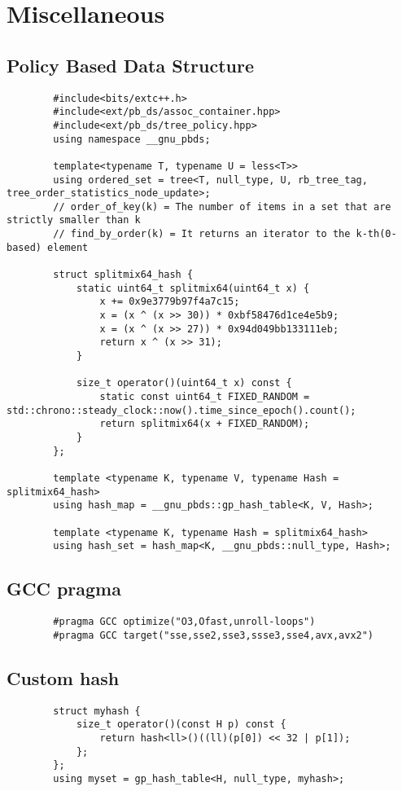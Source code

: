 \documentclass[landscape, 8pt, a4paper, oneside, twocolumn]{extarticle}
\begin{document}
	\section{Miscellaneous}
	\subsection {Policy Based Data Structure}
	\begin{verbatim}
		#include<bits/extc++.h>
		#include<ext/pb_ds/assoc_container.hpp>
		#include<ext/pb_ds/tree_policy.hpp>
		using namespace __gnu_pbds;
		
		template<typename T, typename U = less<T>>
		using ordered_set = tree<T, null_type, U, rb_tree_tag, tree_order_statistics_node_update>;
		// order_of_key(k) = The number of items in a set that are strictly smaller than k
		// find_by_order(k) = It returns an iterator to the k-th(0-based) element
		
		struct splitmix64_hash {
			static uint64_t splitmix64(uint64_t x) {
				x += 0x9e3779b97f4a7c15;
				x = (x ^ (x >> 30)) * 0xbf58476d1ce4e5b9;
				x = (x ^ (x >> 27)) * 0x94d049bb133111eb;
				return x ^ (x >> 31);
			}
			
			size_t operator()(uint64_t x) const {
				static const uint64_t FIXED_RANDOM = std::chrono::steady_clock::now().time_since_epoch().count();
				return splitmix64(x + FIXED_RANDOM);
			}
		};
		
		template <typename K, typename V, typename Hash = splitmix64_hash>
		using hash_map = __gnu_pbds::gp_hash_table<K, V, Hash>;
		
		template <typename K, typename Hash = splitmix64_hash>
		using hash_set = hash_map<K, __gnu_pbds::null_type, Hash>;
	\end{verbatim}
	\subsection {GCC pragma}
	\begin{verbatim}
		#pragma GCC optimize("O3,Ofast,unroll-loops")
		#pragma GCC target("sse,sse2,sse3,ssse3,sse4,avx,avx2")
	\end{verbatim}
	\subsection {Custom hash}
	\begin{verbatim}
		struct myhash {
			size_t operator()(const H p) const {
				return hash<ll>()((ll)(p[0]) << 32 | p[1]);
			};
		};
		using myset = gp_hash_table<H, null_type, myhash>;
	\end{verbatim}
\end{document}
